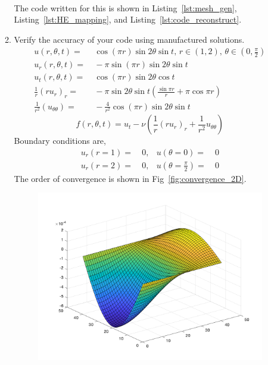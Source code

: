 \documentclass[11pt]{article}
\newcommand{\bra}[1]{\left(#1\right)}
\begin{document}
\begin{enumerate}
\begin{enumerate}
\begin{align*}
    \end{align*}
    The code written for this is shown in Listing~\ref{lst:mesh_gen}, Listing~\ref{lst:HE_mapping}, and Listing~\ref{lst:code_reconstruct}. 
    
    
    
    \item {\color{blue}Verify the accuracy of your code using manufactured solutions.} \\
    \begin{align*}
        u\bra{r,\theta,t} =& \ \cos{\bra{\pi r}}\sin{2\theta}\sin{t}, \, r\in \bra{1,2}, \, \theta \in \bra{0,\frac{\pi}{2}}\\
        u_r\bra{r,\theta,t} =& \ -\pi\sin{\bra{\pi r}}\sin{2\theta}\sin{t} \\
        u_t\bra{r,\theta,t} =& \ \cos{\bra{\pi r}}\sin{2\theta}\cos{t} \\
        \frac{1}{r}\bra{ru_r}_r =& \ -\pi\sin{2\theta}\sin{t}\bra{\frac{\sin{\pi r}}{r} + \pi\cos{\pi r}} \\
        \frac{1}{r^2}\bra{u_{\theta\theta}} =& \ -\frac{4}{r^2}\cos{\bra{\pi r}}\sin{2\theta}\sin{t}
    \end{align*}
    \[
        f(r,\theta,t) = u_t - \nu\bra{\frac{1}{r}\bra{ru_r}_r + \frac{1}{r^2}u_{\theta\theta}}
    \]
    Boundary conditions are, 
    \begin{align*}
        u_r\bra{r=1} =& \ 0, & u\bra{\theta=0} =& \ 0 \\
        u_r\bra{r=2} =& \ 0, & u\bra{\theta=\frac{\pi}{2}} =& \ 0 
    \end{align*}
    The order of convergence is shown in Fig~\ref{fig:convergence_2D}. 
    \begin{figure}[htp]
        \centering
        \includegraphics[width=5in]{ErrPlotQ2.png}

\end{figure}
\end{enumerate}
\end{enumerate}
\end{document}
